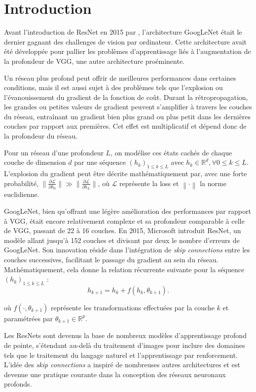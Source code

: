 \chapter{Introduction}
Avant l'introduction de ResNet en 2015 par \citeauthor{resnet}, l'architecture GoogLeNet était le dernier gagnant des challenges de vision par ordinateur. Cette architecture avait été développée pour pallier les problèmes d'apprentissage liés à l'augmentation de la profondeur de VGG, une autre architecture proéminente.

Un réseau plus profond peut offrir de meilleures performances dans certaines conditions, mais il est aussi sujet à des problèmes tels que l'explosion ou l'évanouissement du gradient de la fonction de coût. Durant la rétropropagation, les grandes ou petites valeurs de gradient peuvent s'amplifier à travers les couches du réseau, entraînant un gradient bien plus grand ou plus petit dans les dernières couches par rapport aux premières. Cet effet est multiplicatif et dépend donc de la profondeur du réseau.

Pour un réseau d'une profondeur $L$, on modélise ces états cachés de chaque couche de dimension $d$ par une séquence $(h_k)_{1 \leq k \leq L}$ avec $h_k \in \mathbb{R}^d, \forall 0 \leq k \leq L$. L'explosion du gradient peut être décrite mathématiquement par, avec une forte probabilité, $\| \frac{\partial \mathscr{L}}{\partial h_0} \| \gg \| \frac{\partial \mathscr{L}}{\partial h_L} \|$, où $\mathscr{L}$ représente la loss et $\left\| \cdot \right\|$ la norme euclidienne.

GoogLeNet, bien qu'offrant une légère amélioration des performances par rapport à VGG, était encore relativement complexe et sa profondeur comparable à celle de VGG, passant de 22 à 16 couches. En 2015, Microsoft introduit ResNet, un modèle allant jusqu'à 152 couches et divisant par deux le nombre d'erreurs de GoogLeNet. Son innovation réside dans l'intégration de \textit{skip connections} entre les couches successives, facilitant le passage du gradient au sein du réseau. Mathématiquement, cela donne la relation récurrente suivante pour la séquence $(h_k)_{1 \leq k \leq L}$ :
\[
    h_{k+1} = h_k + f(h_k, \theta_{k+1})
.\]

où $f(\cdot, \theta_{k+1})$ représente les transformations effectuées par la couche $k$ et paramétrées par $\theta_{k+1} \in \mathbb{R}^p$.

Les ResNets sont devenus la base de nombreux modèles d'apprentissage profond de pointe, s'étendant au-delà du traitement d'images pour inclure des domaines tels que le traitement du langage naturel et l'apprentissage par renforcement. L'idée des \textit{skip connections} a inspiré de nombreuses autres architectures et est devenue une pratique courante dans la conception des réseaux neuronaux profonds.

